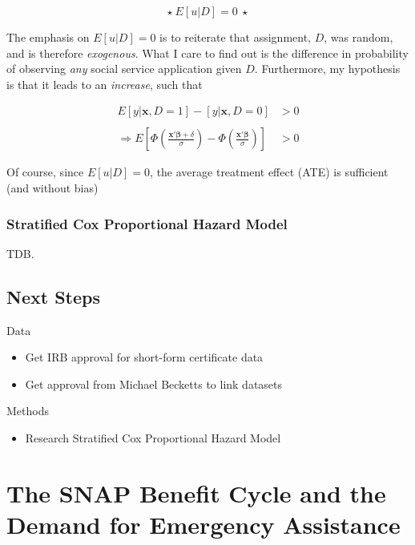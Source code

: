 \documentclass[12pt,letterpaperpaper,]{book}
\providecommand{\tightlist}{%
  \setlength{\itemsep}{0pt}\setlength{\parskip}{0pt}}
\begin{document}
\[
\star ~ E[u|D] = 0 ~ \star
\]

The emphasis on \(E[u|D] = 0\) is to reiterate that assignment, \(D\),
was random, and is therefore \emph{exogenous}. What I care to find out
is the difference in probability of observing \emph{any} social service
application given \(D\). Furthermore, my hypothesis is that it leads to
an \emph{increase}, such that

\[
\begin{aligned}
  E[y|\bm{x}, D=1] - [y|\bm{x}, D=0] &> 0 \\
  \\
  \Rightarrow E \left [ 
        \Phi \left (\frac{\bm{x'\beta}  + \delta}{\sigma} \right )
      -
        \Phi \left (\frac{\bm{x'\beta}}{\sigma} \right )
     \right ]  &> 0
\end{aligned}
\]

Of course, since \(E[u|D] = 0\), the average treatment effect (ATE) is
sufficient (and without bias)

\subsection*{Stratified Cox Proportional Hazard
Model}\label{stratified-cox-proportional-hazard-model}

TDB.

\newpage

\section*{Next Steps}\label{next-steps}

Data

\begin{itemize}
\tightlist
\item
  Get IRB approval for short-form certificate data
\item
  Get approval from Michael Becketts to link datasets
\end{itemize}

Methods

\begin{itemize}
\tightlist
\item
  Research Stratified Cox Proportional Hazard Model
\end{itemize}

\chapter{The SNAP Benefit Cycle and the Demand for Emergency
Assistance}\label{chapter-3}
\end{document}
